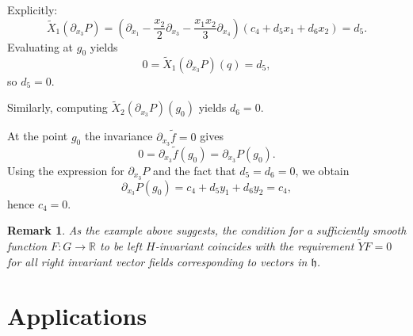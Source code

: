 \documentclass[12pt]{amsart}
\newtheorem{remark}{Remark}[section]
\begin{document}
Explicitly:
\[
\tilde X_1(\partial_{x_3} P)
=
\left(\partial_{x_1} - \frac{x_2}{2}\partial_{x_3} - \frac{x_1 x_2}{3}\partial_{x_4}\right)
(c_4 + d_5 x_1 + d_6 x_2)
= d_5.
\]
Evaluating at $g_0$ yields
\[
0 = \tilde X_1(\partial_{x_3} P)(q) = d_5,
\]
so $d_5=0$.

Similarly, computing $\tilde X_2(\partial_{x_3} P)(g_0)$ yields $d_6=0$.



At the point $g_0$ the invariance $\partial_{x_3}\tilde f=0$ gives
\[
0 = \partial_{x_3}\tilde f(g_0) = \partial_{x_3} P(g_0).
\]
Using the expression for $\partial_{x_3} P$ and the fact that $d_5=d_6=0$, we obtain
\[
\partial_{x_3} P(g_0) = c_4 + d_5 y_1 + d_6 y_2 = c_4,
\]
hence $c_4=0$.
\begin{remark}
    As the example above suggests, the condition for a sufficiently smooth function $F:G\to \mathbb R$ to be left $H$-invariant coincides with the requirement $\tilde Y F = 0$ for all right invariant vector fields corresponding to vectors in $\mathfrak h$. 
\end{remark}





\section{Applications}\label{app}
\end{document}
